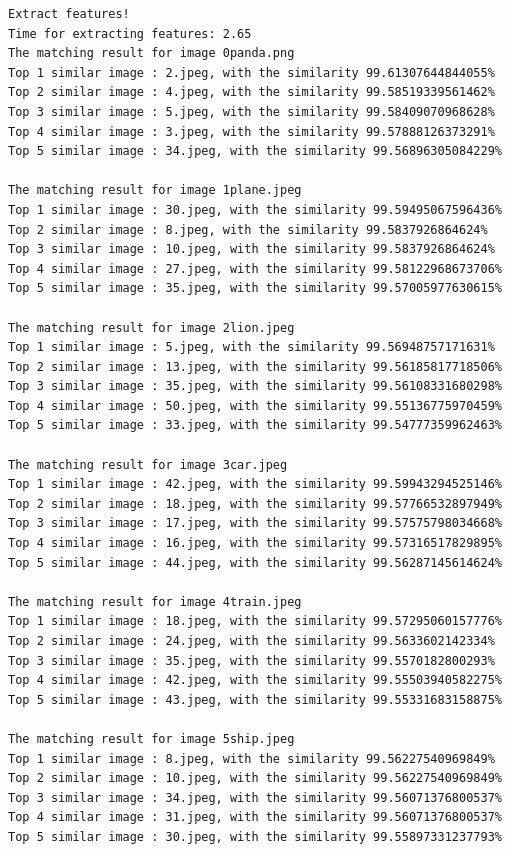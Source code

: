 \documentclass{article}
\begin{document}
\begin{lstlisting}
Extract features!
Time for extracting features: 2.65
The matching result for image 0panda.png
Top 1 similar image : 2.jpeg, with the similarity 99.61307644844055%
Top 2 similar image : 4.jpeg, with the similarity 99.58519339561462%
Top 3 similar image : 5.jpeg, with the similarity 99.58409070968628%
Top 4 similar image : 3.jpeg, with the similarity 99.57888126373291%
Top 5 similar image : 34.jpeg, with the similarity 99.56896305084229%

The matching result for image 1plane.jpeg
Top 1 similar image : 30.jpeg, with the similarity 99.59495067596436%
Top 2 similar image : 8.jpeg, with the similarity 99.5837926864624%
Top 3 similar image : 10.jpeg, with the similarity 99.5837926864624%
Top 4 similar image : 27.jpeg, with the similarity 99.58122968673706%
Top 5 similar image : 35.jpeg, with the similarity 99.57005977630615%

The matching result for image 2lion.jpeg
Top 1 similar image : 5.jpeg, with the similarity 99.56948757171631%
Top 2 similar image : 13.jpeg, with the similarity 99.56185817718506%
Top 3 similar image : 35.jpeg, with the similarity 99.56108331680298%
Top 4 similar image : 50.jpeg, with the similarity 99.55136775970459%
Top 5 similar image : 33.jpeg, with the similarity 99.54777359962463%

The matching result for image 3car.jpeg
Top 1 similar image : 42.jpeg, with the similarity 99.59943294525146%
Top 2 similar image : 18.jpeg, with the similarity 99.57766532897949%
Top 3 similar image : 17.jpeg, with the similarity 99.57575798034668%
Top 4 similar image : 16.jpeg, with the similarity 99.57316517829895%
Top 5 similar image : 44.jpeg, with the similarity 99.56287145614624%

The matching result for image 4train.jpeg
Top 1 similar image : 18.jpeg, with the similarity 99.57295060157776%
Top 2 similar image : 24.jpeg, with the similarity 99.5633602142334%
Top 3 similar image : 35.jpeg, with the similarity 99.5570182800293%
Top 4 similar image : 42.jpeg, with the similarity 99.55503940582275%
Top 5 similar image : 43.jpeg, with the similarity 99.55331683158875%

The matching result for image 5ship.jpeg
Top 1 similar image : 8.jpeg, with the similarity 99.56227540969849%
Top 2 similar image : 10.jpeg, with the similarity 99.56227540969849%
Top 3 similar image : 34.jpeg, with the similarity 99.56071376800537%
Top 4 similar image : 31.jpeg, with the similarity 99.56071376800537%
Top 5 similar image : 30.jpeg, with the similarity 99.55897331237793%


\end{lstlisting}
\end{document}

